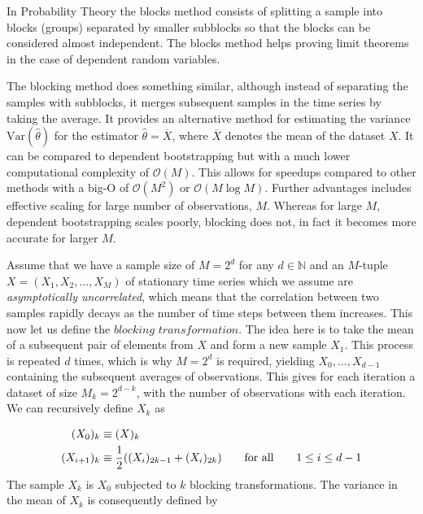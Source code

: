 In Probability Theory the blocks method consists of splitting a sample into blocks (groups) separated by smaller subblocks so that the blocks can be considered almost independent. The blocks method helps proving limit theorems in the case of dependent random variables. 

The blocking method does something similar, although instead of separating the samples with subblocks, it merges subsequent samples in the time series by taking the average. It provides an alternative method for estimating the variance $\text{Var}(\hat{\theta})$ for the estimator $\hat{\theta} = \overline{X}$, where $\overline{X}$ denotes the mean of the dataset $X$. It can be compared to dependent bootstrapping but with a much lower computational complexity of $\mathcal{O}(M)$. This allows for speedups compared to other methods with a big-O of $\mathcal{O}(M^2)$ or $\mathcal{O}(M \log M)$. Further advantages includes effective scaling for large number of observations,  $M$. Whereas for large $M$, dependent bootstrapping scales poorly, blocking does not, in fact it becomes more accurate for larger $M$.  

Assume that we have a sample size of $M = 2^d$ for any $d \in \mathbb{N}$ and an $M$-tuple $X = (X_1, X_2, \dots, X_M)$ of stationary time series which we assume are \textit{asymptotically uncorrelated}, which means that the correlation between two samples rapidly decays as the number of time steps between them increases. This now let us define the $\textit{blocking transformation}$. The idea here is to take the mean of a subsequent pair of elements from $X$ and form a new sample $X_1$. This process is repeated $d$ times, which is why $M=2^d$ is required, yielding $X_0, \dots, X_{d-1}$ containing the subsequent averages of observations. This gives for each iteration a dataset of size $M_k = 2^{d-k}$, with the number of observations with each iteration. We can recursively define $X_k$ as

\begin{align*}
(X_0)_k &\equiv (X)_k \nonumber \\
(X_{i+1})_k &\equiv \frac{1}{2}\qty( (X_i)_{2k-1} +
(X_i)_{2k} ) \qquad \text{for all} \qquad 1 \leq i \leq d-1
\label{eq:recursiveX}
\end{align*}
The sample $X_k$ is $X_0$ subjected to $k$ blocking transformations.
The variance in the mean of $X_k$ is consequently defined by

